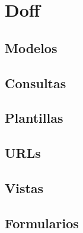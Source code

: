 \chapter{Doff}

\section{Modelos}

\section{Consultas}

\section{Plantillas}

\section{URLs}

\section{Vistas}

\section{Formularios}
